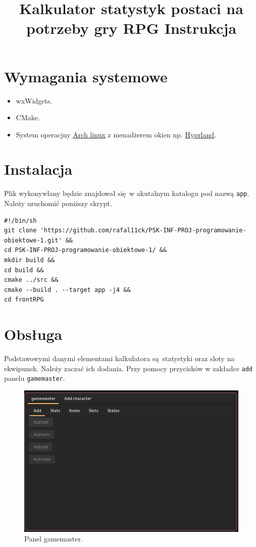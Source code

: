 \documentclass[11pt]{article}
\date{}
\title{Kalkulator statystyk postaci na potrzeby gry RPG Instrukcja}
\begin{document}
\maketitle
\newpage
\section{Wymagania systemowe}
\label{sec:orgbc56e66}
\begin{itemize}
\item wxWidgets.
\item CMake.
\item System operacjny \href{https://wiki.archlinux.org/title/Arch\_Linux}{Arch linux} z menadżerem okien np. \href{https://hyprland.org/}{Hyprland}.
\end{itemize}
\section{Instalacja}
\label{sec:org9dabdf0}
Plik wykonywlany będzie znajdował się w akutalnym katalogu pod nazwą \texttt{app}. Należy uruchomić poniższy skrypt.
\begin{verbatim}
#!/bin/sh
git clone 'https://github.com/rafal11ck/PSK-INF-PROJ-programowanie-obiektowe-1.git' &&
cd PSK-INF-PROJ-programowanie-obiektowe-1/ &&
mkdir build &&
cd build &&
cmake ../src &&
cmake --build . --target app -j4 &&
cd frontRPG
\end{verbatim}
\newpage
\section{Obsługa}
\label{sec:org3cb56fc}
Podstawowymi danymi elementami kalkulatora są statystyki oraz sloty na ekwipunek. Należy zaczać ich dodania. Przy pomocy przycisków w zakładce \texttt{add} panelu \texttt{gamemaster}.
\begin{figure}[htbp]
\centering
\includegraphics[width=.9\linewidth]{img/gamemaster.png}
\caption{Panel gamemaster.}
\end{figure}
\end{document}
